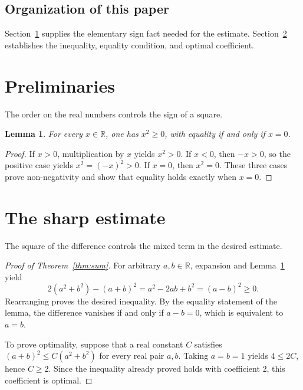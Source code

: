 \documentclass[a4paper,11pt,reqno]{amsart}
\newcommand{\R}{\mathbb{R}}
\numberwithin{equation}{section}
\theoremstyle{plain}
\newtheorem{lem}[thm]{Lemma}
\theoremstyle{definition}
\theoremstyle{remark}
\begin{document}
\subsection{Organization of this paper}
Section~\ref{sec:preliminaries} supplies the elementary sign fact needed for the estimate. Section~\ref{sec:proof} establishes the inequality, equality condition, and optimal coefficient.

\section{Preliminaries}\label{sec:preliminaries}
The order on the real numbers controls the sign of a square.
\begin{lem}\label{lem:square}
For every $x\in\R$, one has $x^2\geq0$, with equality if and only if $x=0$.
\end{lem}
\begin{proof}
If $x>0$, multiplication by $x$ yields $x^2>0$.
If $x<0$, then $-x>0$, so the positive case yields $x^2=(-x)^2>0$.
If $x=0$, then $x^2=0$. These three cases prove non-negativity and show that equality holds exactly when $x=0$.
\end{proof}

\section{The sharp estimate}\label{sec:proof}
The square of the difference controls the mixed term in the desired estimate.
\begin{proof}[Proof of Theorem~\ref{thm:sum}]
For arbitrary $a,b\in\R$, expansion and Lemma~\ref{lem:square} yield
\[
 2(a^2+b^2)-(a+b)^2=a^2-2ab+b^2=(a-b)^2\geq0.
\]
Rearranging proves the desired inequality. By the equality statement of the lemma, the difference vanishes if and only if $a-b=0$, which is equivalent to $a=b$.

To prove optimality, suppose that a real constant $C$ satisfies $(a+b)^2\leq C(a^2+b^2)$ for every real pair $a,b$. Taking $a=b=1$ yields $4\leq2C$, hence $C\geq2$. Since the inequality already proved holds with coefficient $2$, this coefficient is optimal.
\end{proof}



\end{document}
